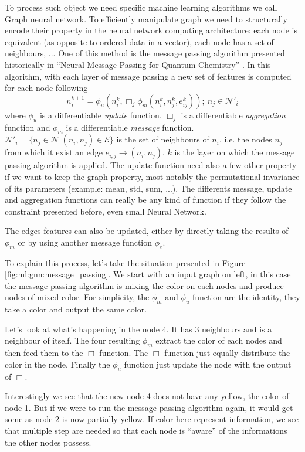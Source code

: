 \documentclass[../main.tex]{subfiles}
\begin{document}
To process such object we need specific machine learning algorithms we call Graph neural network.
To efficiently manipulate graph we need to structurally encode their property in the neural network computing architecture: each node is equivalent (as opposite to ordered data in a vector), each node has a set of neighbours, ... One of this method is the message passing algorithm presented historically in ``Neural Message Passing for Quantum Chemistry'' \cite{gilmer_neural_2017}. In this algorithm, with each layer of message passing a new set of features is computed for each node following
\begin{equation}
  n_i^{k+1} = \phi_u (n_i^k, \Box_j \phi_m(n_i^k, n_j^k, e^k_{ij})); ~ n_j \in \mathcal{N}'_i
\end{equation}
where $\phi_u$ is a differentiable \textit{update} function, $\Box_j$ is a differentiable \textit{aggregation} function and $\phi_m$ is a differentiable \textit{message} function. $\mathcal{N}'_i = \{n_j \in \mathcal{N} | (n_i, n_j) \in \mathcal{E}\}$ is the set of neighbours of $n_i$, i.e. the nodes $n_j$ from which it exist an edge $e_{i,j} \rightarrow (n_i, n_j)$. $k$ is the layer on which the message passing algorithm is applied. The update function need also a few other property if we want to keep the graph property, most notably the permutational invariance of its parameters (example: mean, std, sum, ...). The differents message, update and aggregation functions can really be any kind of function if they follow the constraint presented before, even small Neural Network.

The edges features can also be updated, either by directly taking the results of $\phi_m$ or by using another message function $\phi_e$.

To explain this process, let's take the situation presented in Figure \ref{fig:ml:gnn:message_passing}. We start with an input graph on left, in this case the message passing algorithm is mixing the color on each nodes and produce nodes of mixed color. For simplicity, the $\phi_m$ and $\phi_u$ function are the identity, they take a color and output the same color.

Let's look at what's happening in the node 4. It has 3 neighbours and is a neighbour of itself. The four resulting $\phi_m$ extract the color of each nodes and then feed them to the $\Box$ function. The $\Box$ function just equally distribute the color in the node. Finally the $\phi_u$ function just update the node with the output of $\Box$.

Interestingly we see that the new node 4 does not have any yellow, the color of node 1. But if we were to run the message passing algorithm again, it would get some as node 2 is now partially yellow. If color here represent information, we see that multiple step are needed so that each node is ``aware'' of the informations the other nodes possess.
\end{document}
